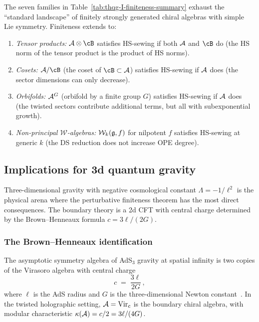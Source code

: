 \begin{remark}[Exhaustiveness]
\label{rem:thqg-I-exhaustiveness}
The seven families in Table~\ref{tab:thqg-I-finiteness-summary} exhaust the ``standard landscape'' of finitely strongly generated chiral algebras with simple Lie symmetry. Finiteness extends to:
\begin{enumerate}[label=\textup{(\alph*)}]
\item \emph{Tensor products:} $\cA \otimes \cB$ satisfies HS-sewing if both $\mathcal{A}$ and $\cB$ do (the HS norm of the tensor product is the product of HS norms).
\item \emph{Cosets:} $\cA / \cB$ (the coset of $\cB \subset \cA$) satisfies HS-sewing if $\mathcal{A}$ does (the sector dimensions can only decrease).
\item \emph{Orbifolds:} $\mathcal{A}^G$ (orbifold by a finite group $G$) satisfies HS-sewing if $\mathcal{A}$ does (the twisted sectors contribute additional terms, but all with subexponential growth).
\item \emph{Non-principal $\mathcal{W}$-algebras:} $\mathcal{W}_k(\mathfrak{g}, f)$ for nilpotent $f$ satisfies HS-sewing at generic $k$ (the DS reduction does not increase OPE degree).
\end{enumerate}
\end{remark}



\subsection{Implications for 3d quantum gravity}
\label{subsec:thqg-I-3d-gravity}

Three-dimensional gravity with negative cosmological constant $\Lambda = -1/\ell^2$ is the physical arena where the perturbative finiteness theorem has the most direct consequences. The boundary theory is a 2d CFT with central charge determined by the Brown--Henneaux formula $c = 3\ell/(2G)$.

\subsubsection{The Brown--Henneaux identification}

\begin{setup}
\label{setup:thqg-I-brown-henneaux}
The asymptotic symmetry algebra of AdS$_3$ gravity at spatial infinity is two copies of the Virasoro algebra with central charge
\begin{equation}\label{eq:thqg-I-brown-henneaux}
c \;=\; \frac{3\ell}{2G}\,,
\end{equation}
where $\ell$ is the AdS radius and $G$ is the three-dimensional Newton constant~\cite{BH86}. In the twisted holographic setting, $\mathcal{A} = \mathrm{Vir}_c$ is the boundary chiral algebra, with modular characteristic $\kappa(\mathcal{A}) = c/2 = 3\ell/(4G)$.
\end{setup}

